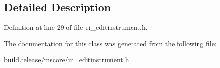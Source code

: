 \subsection{Detailed Description}


Definition at line 29 of file ui\+\_\+editinstrument.\+h.



The documentation for this class was generated from the following file\+:\begin{DoxyCompactItemize}
\item 
build.\+release/mscore/ui\+\_\+editinstrument.\+h\end{DoxyCompactItemize}
